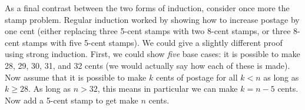 \documentclass[10pt,]{book}
\theoremstyle{plain}
\theoremstyle{definition}
\theoremstyle{definition}
\theoremstyle{definition}
\numberwithin{equation}{chapter}
\newcommand{\lt}{ < }
\begin{document}
As a final contrast between the two forms of induction, consider once more the stamp problem. Regular induction worked by showing how to increase postage by one cent (either replacing three 5-cent stamps with two 8-cent stamps, or three 8-cent stamps with five 5-cent stamps). We could give a slightly different proof using strong induction. First, we could show \emph{five} base cases: it is possible to make 28, 29, 30, 31, and 32 cents (we would actually say how each of these is made). Now assume that it is possible to make \(k\) cents of postage for all \(k \lt  n\) as long as \(k \ge 28\). As long as \(n > 32\), this means in particular we can make \(k = n-5\) cents. Now add a 5-cent stamp to get make \(n\) cents.
%
\typeout{************************************************}
\typeout{************************************************}
\end{document}

